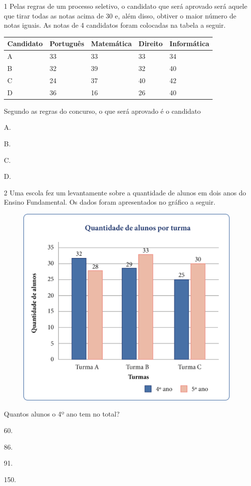 
\num{1} Pelas regras de um processo seletivo, o candidato que será aprovado será
aquele que tirar todas as notas acima de 30 e, além disso, obtiver o maior
número de notas iguais. As notas de 4 candidatos foram colocadas na
tabela a seguir.

\begin{longtable}[]{@{}lllll@{}}
\toprule
Candidato & Português & Matemática & Direito &
Informática\tabularnewline
\midrule
\endhead
A & 33 & 33 & 33 & 34\tabularnewline
B & 32 & 39 & 32 & 40\tabularnewline
C & 24 & 37 & 40 & 42\tabularnewline
D & 36 & 16 & 26 & 40\tabularnewline
\bottomrule
\end{longtable}

Segundo as regras do concurso, o que será aprovado é o candidato

\begin{multicols}{2}
\begin{escolha}
\item
  A.
\item
  B.
\item
  C.
\item
  D.
\end{escolha}
\end{multicols}



\num{2} Uma escola fez um levantamente sobre a quantidade de alunos em dois anos
do Ensino Fundamental. Os dados foram apresentados no gráfico a seguir.

\begin{figure}[htpb!]
\centering
\includegraphics[width=.6\textwidth]{media/image50.png}
\end{figure}

Quantos alunos o 4º ano tem no total?

\begin{escolha}
\item
  60.
\item
  86.
\item
  91.
\item
  150.
\end{escolha}



